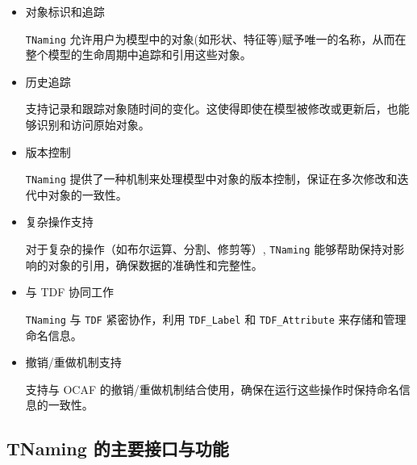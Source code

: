 \documentclass[11pt]{article}
\begin{document}
\begin{itemize}
\item 对象标识和追踪

\texttt{TNaming} 允许用户为模型中的对象(如形状、特征等)赋予唯一的名称，从而在整个模型的生命周期中追踪和引用这些对象。

\item 历史追踪

支持记录和跟踪对象随时间的变化。这使得即使在模型被修改或更新后，也能够识别和访问原始对象。

\item 版本控制

\texttt{TNaming} 提供了一种机制来处理模型中对象的版本控制，保证在多次修改和迭代中对象的一致性。

\item 复杂操作支持

对于复杂的操作（如布尔运算、分割、修剪等）, \texttt{TNaming} 能够帮助保持对影响的对象的引用，确保数据的准确性和完整性。

\item 与 TDF 协同工作

\texttt{TNaming} 与 \texttt{TDF} 紧密协作，利用 \texttt{TDF\_Label} 和 \texttt{TDF\_Attribute} 来存储和管理命名信息。

\item 撤销/重做机制支持

支持与 OCAF 的撤销/重做机制结合使用，确保在运行这些操作时保持命名信息的一致性。
\end{itemize}
\subsection{TNaming 的主要接口与功能}
\label{sec:org19740f3}
\end{document}
